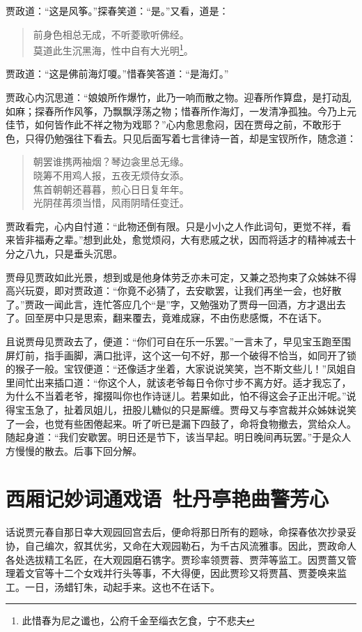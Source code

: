 \documentclass[12pt,oneside]{book}
\newenvironment{shici}{%
\begin{verse}%
\centering\large\hspace{12pt}}%
{\end{verse}}
\begin{document}
贾政道：“这是风筝。”探春笑道：“是。”又看，道是：

\begin{shici}
前身色相总无成，不听菱歌听佛经。\\
莫道此生沉黑海，性中自有大光明\footnote{此惜春为尼之谶也，公府千金至缁衣乞食，宁不悲夫}。
\end{shici}

贾政道：“这是佛前海灯嗄。”惜春笑答道：“是海灯。”

贾政心内沉思道：“娘娘所作爆竹，此乃一响而散之物。迎春所作算盘，是打动乱如麻；探春所作风筝，乃飘飘浮荡之物；惜春所作海灯，一发清净孤独。今乃上元佳节，如何皆作此不祥之物为戏耶？”心内愈思愈闷，因在贾母之前，不敢形于色，只得仍勉强往下看去。只见后面写着七言律诗一首，却是宝钗所作，随念道：

\begin{shici}
朝罢谁携两袖烟？琴边衾里总无缘。\\
晓筹不用鸡人报，五夜无烦侍女添。\\
焦首朝朝还暮暮，煎心日日复年年。\\
光阴荏苒须当惜，风雨阴晴任变迁。
\end{shici}


贾政看完，心内自忖道：“此物还倒有限。只是小小之人作此词句，更觉不祥，看来皆非福寿之辈。”想到此处，愈觉烦闷，大有悲戚之状，因而将适才的精神减去十分之八九，只是垂头沉思。

贾母见贾政如此光景，想到或是他身体劳乏亦未可定，又兼之恐拘束了众姊妹不得高兴玩耍，即对贾政道：“你竟不必猜了，去安歇罢，让我们再坐一会，也好散了。”贾政一闻此言，连忙答应几个“是”字，又勉强劝了贾母一回酒，方才退出去了。回至房中只是思索，翻来覆去，竟难成寐，不由伤悲感慨，不在话下。

且说贾母见贾政去了，便道：“你们可自在乐一乐罢。”一言未了，早见宝玉跑至围屏灯前，指手画脚，满口批评，这个这一句不好，那一个破得不恰当，如同开了锁的猴子一般。宝钗便道：“还像适才坐着，大家说说笑笑，岂不斯文些儿！”凤姐自里间忙出来插口道：“你这个人，就该老爷每日令你寸步不离方好。适才我忘了，为什么不当着老爷，撺掇叫你也作诗谜儿。若果如此，怕不得这会子正出汗呢。”说得宝玉急了，扯着凤姐儿，扭股儿糖似的只是厮缠。贾母又与李宫裁并众姊妹说笑了一会，也觉有些困倦起来。听了听已是漏下四鼓了，命将食物撤去，赏给众人。随起身道：“我们安歇罢。明日还是节下，该当早起。明日晚间再玩罢。”于是众人方慢慢的散去。后事下回分解。



\chapter{西厢记妙词通戏语~牡丹亭艳曲警芳心}
话说贾元春自那日幸大观园回宫去后，便命将那日所有的题咏，命探春依次抄录妥协，自己编次，叙其优劣，又命在大观园勒石，为千古风流雅事。因此，贾政命人各处选拔精工名匠，在大观园磨石镌字。贾珍率领贾蓉、贾萍等监工。因贾蔷又管理着文官等十二个女戏并行头等事，不大得便，因此贾珍又将贾菖、贾菱唤来监工。一日，汤蜡钉朱，动起手来。这也不在话下。
\end{document}
